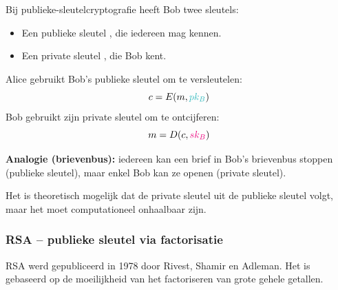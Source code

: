 Bij publieke-sleutelcryptografie heeft Bob twee sleutels:
\begin{itemize}
    \item Een publieke sleutel , die iedereen mag kennen.
    \item Een private sleutel , die  Bob kent.
\end{itemize}
Alice gebruikt Bob's publieke sleutel om te versleutelen:
\begin{equation*}
    c = E(m, \textcolor{Aquamarine}{pk_B})
\end{equation*}
Bob gebruikt zijn private sleutel om te ontcijferen:
\begin{equation*}
    m = D(c, \textcolor{RubineRed}{sk_B})
\end{equation*}
\begin{barbox}[RoyalPurple!75][gray!3]
    \textcolor{RoyalPurple!75}{\textbf{Analogie (brievenbus):}} iedereen kan een brief in Bob's brievenbus stoppen (publieke sleutel), maar enkel Bob kan ze openen (private sleutel).
\end{barbox}
Het is theoretisch mogelijk dat de private sleutel uit de publieke sleutel volgt, maar het moet computationeel onhaalbaar zijn.

\subsubsection{RSA -- publieke sleutel via factorisatie}

RSA werd gepubliceerd in 1978 door Rivest, Shamir en Adleman. Het is gebaseerd op de moeilijkheid van het factoriseren van grote gehele getallen.


